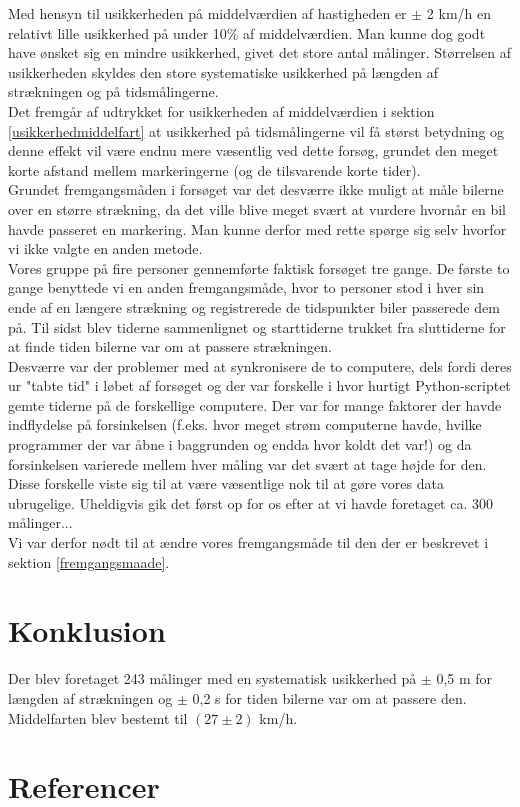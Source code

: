 \documentclass[hidelinks]{article}
\begin{document}
Med hensyn til usikkerheden på middelværdien af hastigheden er $\pm$ 2 km/h en relativt lille usikkerhed på under 10\% af middelværdien. Man kunne dog godt have ønsket sig en mindre usikkerhed, givet det store antal målinger. Størrelsen af usikkerheden skyldes den store systematiske usikkerhed på længden af strækningen og på tidsmålingerne. \\

Det fremgår af udtrykket for usikkerheden af middelværdien i sektion \ref{usikkerhedmiddelfart} at usikkerhed på tidsmålingerne vil få størst betydning og denne effekt vil være endnu mere væsentlig ved dette forsøg, grundet den meget korte afstand mellem markeringerne (og de tilsvarende korte tider).\\

Grundet fremgangsmåden i forsøget var det desværre ikke muligt at måle bilerne over en større strækning, da det ville blive meget svært at vurdere hvornår en bil havde passeret en markering. Man kunne derfor med rette spørge sig selv hvorfor vi ikke valgte en anden metode.\\

Vores gruppe på fire personer gennemførte faktisk forsøget tre gange. De første to gange benyttede vi en anden fremgangsmåde, hvor to personer stod i hver sin ende af en længere strækning og registrerede de tidspunkter biler passerede dem på. Til sidst blev tiderne sammenlignet og starttiderne trukket fra sluttiderne for at finde tiden bilerne var om at passere strækningen.\\

Desværre var der problemer med at synkronisere de to computere, dels fordi deres ur "tabte tid" i løbet af forsøget og der var forskelle i hvor hurtigt Python-scriptet gemte tiderne på de forskellige computere. Der var for mange faktorer der havde indflydelse på forsinkelsen (f.eks. hvor meget strøm computerne havde, hvilke programmer der var åbne i baggrunden og endda hvor koldt det var!) og da forsinkelsen varierede mellem hver måling var det svært at tage højde for den.\\

Disse forskelle viste sig til at være væsentlige nok til at gøre vores data ubrugelige. Uheldigvis gik det først op for os efter at vi havde foretaget ca. 300 målinger...\\

Vi var derfor nødt til at ændre vores fremgangsmåde til den der er beskrevet i sektion \ref{fremgangsmaade}.

\section{Konklusion}

Der blev foretaget 243 målinger med en systematisk usikkerhed på $\pm$ 0,5 m for længden af strækningen og $\pm$ 0,2 s for tiden bilerne var om at passere den.\\

Middelfarten blev bestemt til $(27 \pm 2)$ km/h.

\section{Referencer}
\printbibliography[
heading=none
]
\end{document}
